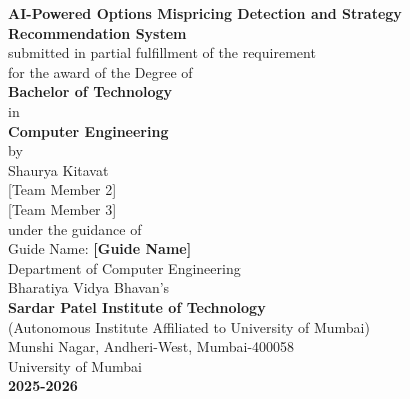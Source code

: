 \documentclass[12pt,a4paper]{article}
\begin{document}
\begin{titlepage}
\begin{center}

\vspace*{0.5cm}


{\LARGE \textbf{AI-Powered Options Mispricing Detection and Strategy Recommendation System}}\\[1.5cm]

{\large submitted in partial fulfillment of the requirement\\
for the award of the Degree of}\\[1cm]

{\Large \textbf{Bachelor of Technology}}\\[0.3cm]
{\large in}\\[0.3cm]
{\Large \textbf{Computer Engineering}}\\[1.5cm]

{\large by}\\[0.8cm]

{\large Shaurya Kitavat}\\
{\large [Team Member 2]}\\
{\large [Team Member 3]}\\[1.5cm]

{\large under the guidance of}\\[0.5cm]

{\large Guide Name: \textbf{[Guide Name]}}\\[1.5cm]

{\large Department of Computer Engineering}\\
{\large Bharatiya Vidya Bhavan's}\\
{\large \textbf{Sardar Patel Institute of Technology}}\\
{\large (Autonomous Institute Affiliated to University of Mumbai)}\\
{\large Munshi Nagar, Andheri-West, Mumbai-400058}\\
{\large University of Mumbai}\\[1cm]

{\large \textbf{2025-2026}}

\end{center}
\end{titlepage}
\end{document}
